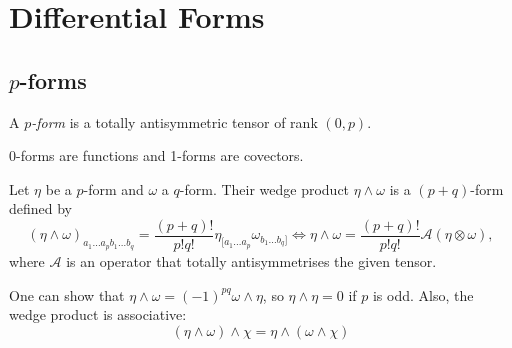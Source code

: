 \documentclass{jknotes}
\begin{document}
\section{Differential Forms}
\subsection{\texorpdfstring{$p$}{p}-forms}

\begin{defn}
    A \emph{\(p\)-form} is a totally antisymmetric tensor of rank \((0,p)\).
\end{defn}
0-forms are functions and 1-forms are covectors.
\begin{defn}
    Let \(\eta\) be a \(p\)-form and \(\omega\) a \(q\)-form. Their wedge product \(\eta\wedge\omega\) is a \((p+q)\)-form defined by
    \begin{equation}
        (\eta\wedge\omega)_{a_1\dots a_pb_1\dots b_q} = \frac{(p+q)!}{p!q!}\eta_{[a_1\dots a_p}\omega_{b_1\dots b_q]} \iff \eta\wedge\omega = \frac{(p+q)!}{p!q!} \mathcal{A}(\eta\otimes\omega),
    \end{equation}
    where \(\mathcal{A}\) is an operator that totally antisymmetrises the given tensor.
\end{defn}
One can show that \(\eta\wedge\omega=(-1)^{pq}\omega\wedge\eta\), so \(\eta\wedge\eta = 0\) if \(p\) is odd. Also, the wedge product is associative:
\begin{equation}
    (\eta\wedge\omega)\wedge\chi = \eta\wedge(\omega\wedge\chi)
\end{equation}
\end{document}

